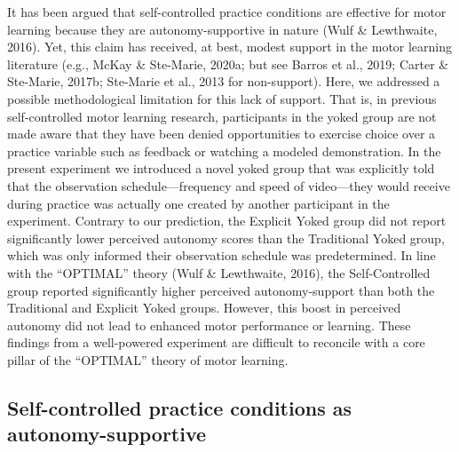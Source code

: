 \documentclass[
  english,
  jou]{apa7}
\begin{document}
It has been argued that self-controlled practice conditions are effective for motor learning because they are autonomy-supportive in nature (Wulf \& Lewthwaite, 2016). Yet, this claim has received, at best, modest support in the motor learning literature (e.g., McKay \& Ste-Marie, 2020a; but see Barros et al., 2019; Carter \& Ste-Marie, 2017b; Ste-Marie et al., 2013 for non-support). Here, we addressed a possible methodological limitation for this lack of support. That is, in previous self-controlled motor learning research, participants in the yoked group are not made aware that they have been denied opportunities to exercise choice over a practice variable such as feedback or watching a modeled demonstration. In the present experiment we introduced a novel yoked group that was explicitly told that the observation schedule---frequency and speed of video---they would receive during practice was actually one created by another participant in the experiment. Contrary to our prediction, the Explicit Yoked group did not report significantly lower perceived autonomy scores than the Traditional Yoked group, which was only informed their observation schedule was predetermined. In line with the ``OPTIMAL'' theory (Wulf \& Lewthwaite, 2016), the Self-Controlled group reported significantly higher perceived autonomy-support than both the Traditional and Explicit Yoked groups. However, this boost in perceived autonomy did not lead to enhanced motor performance or learning. These findings from a well-powered experiment are difficult to reconcile with a core pillar of the ``OPTIMAL'' theory of motor learning.

\hypertarget{self-controlled-practice-conditions-as-autonomy-supportive}{%
\subsection{Self-controlled practice conditions as autonomy-supportive}\label{self-controlled-practice-conditions-as-autonomy-supportive}}
\end{document}

